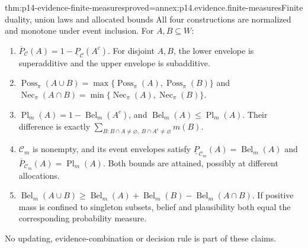 \begin{hbtheorem}{thm:p14-evidence-finite-measures}{proved=annex:p14.evidence.finite-measures}{Finite duality, union laws and allocated bounds}
All four constructions are normalized and monotone under event inclusion.
For \(A,B\subseteq W\):
\begin{enumerate}
\item \(\overline P_{\mathcal C}(A)=1-\underline P_{\mathcal C}(A^c)\).
      For disjoint \(A,B\), the lower envelope is superadditive and the
      upper envelope is subadditive.
\item \(\operatorname{Poss}_{\pi}(A\cup B)=
      \max\{\operatorname{Poss}_{\pi}(A),\operatorname{Poss}_{\pi}(B)\}\)
      and \(\operatorname{Nec}_{\pi}(A\cap B)=
      \min\{\operatorname{Nec}_{\pi}(A),\operatorname{Nec}_{\pi}(B)\}\).
\item \(\operatorname{Pl}_m(A)=1-\operatorname{Bel}_m(A^c)\), and
      \(\operatorname{Bel}_m(A)\leq\operatorname{Pl}_m(A)\).
      Their difference is exactly
      \(\sum_{B:B\cap A\ne\varnothing,\ B\cap A^c\ne\varnothing}m(B)\).
\item \(\mathcal C_m\) is nonempty, and its event envelopes satisfy
      \(\underline P_{\mathcal C_m}(A)=\operatorname{Bel}_m(A)\) and
      \(\overline P_{\mathcal C_m}(A)=\operatorname{Pl}_m(A)\).
      Both bounds are attained, possibly at different allocations.
\item \(\operatorname{Bel}_m(A\cup B)\geq
      \operatorname{Bel}_m(A)+\operatorname{Bel}_m(B)
      -\operatorname{Bel}_m(A\cap B)\).
      If positive mass is confined to singleton subsets, belief and
      plausibility both equal the corresponding probability measure.
\end{enumerate}
No updating, evidence-combination or decision rule is part of these claims.
\end{hbtheorem}

